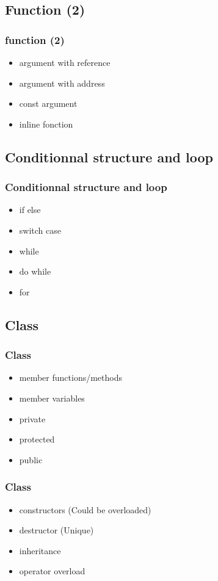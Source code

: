 \documentclass{beamer}
\begin{document}
\subsection{Function (2)}
\label{sub:function_2_}

\begin{frame}
	\frametitle{function (2)}
	\begin{itemize}
		\item argument with reference
		\item argument with address
		\item const argument
		\item inline fonction
	\end{itemize}
\end{frame}

\subsection{Conditionnal structure and loop}
\label{sub:condition}

\begin{frame}
	\frametitle{Conditionnal structure and loop}
	\begin{itemize}
		\item if else
		\item switch case
		\item while
		\item do while
		\item for
	\end{itemize}
\end{frame}

\subsection{Class}
\label{sub:class}

\begin{frame}
	\frametitle{Class}
	\begin{itemize}
		\item member functions/methods
		\item member variables
		\item private
		\item protected
		\item public
	\end{itemize}
\end{frame}

\begin{frame}
	\frametitle{Class}
	\begin{itemize}
		\item constructors (Could be overloaded) 
		\item destructor (Unique)
		\item inheritance
		\item operator overload
	\end{itemize}
\end{frame}
\end{document}
